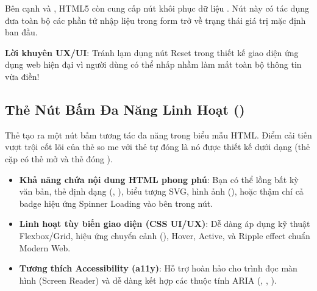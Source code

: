 \begin{tipBox}[Lưu Ý Về Nút Khôi Phục Dữ Liệu \codeinline{<input type="reset">}]
Bên cạnh  và , HTML5 còn cung cấp nút khôi phục dữ liệu . Nút này có tác dụng đưa toàn bộ các phần tử nhập liệu trong form trở về trạng thái giá trị mặc định ban đầu.
\par\vspace{3pt}
\textbf{Lời khuyên UX/UI}: Tránh lạm dụng nút Reset trong thiết kế giao diện ứng dụng web hiện đại vì người dùng có thể nhấp nhầm làm mất toàn bộ thông tin vừa điền!
\end{tipBox}

\subsection{Thẻ Nút Bấm Đa Năng Linh Hoạt ()}
\label{subsec:button_tag}

\begin{conceptBox}
Thẻ  tạo ra một nút bấm tương tác đa năng trong biểu mẫu HTML. Điểm cải tiến vượt trội cốt lõi của thẻ  so me với thẻ tự đóng  là nó được thiết kế dưới dạng  (thẻ cặp có thẻ mở  và thẻ đóng ).
\begin{itemize}[leftmargin=1.5em, itemsep=3pt, parsep=0pt]
    \item \textbf{Khả năng chứa nội dung HTML phong phú}: Bạn có thể lồng bất kỳ văn bản, thẻ định dạng (, ), biểu tượng SVG, hình ảnh (), hoặc thậm chí cả badge hiệu ứng Spinner Loading vào bên trong nút.
    \item \textbf{Linh hoạt tùy biến giao diện (CSS UI/UX)}: Dễ dàng áp dụng kỹ thuật Flexbox/Grid, hiệu ứng chuyển cảnh (), Hover, Active, và Ripple effect chuẩn Modern Web.
    \item \textbf{Tương thích Accessibility (a11y)}: Hỗ trợ hoàn hảo cho trình đọc màn hình (Screen Reader) và dễ dàng kết hợp các thuộc tính ARIA (, , ).
\end{itemize}
\end{conceptBox}

